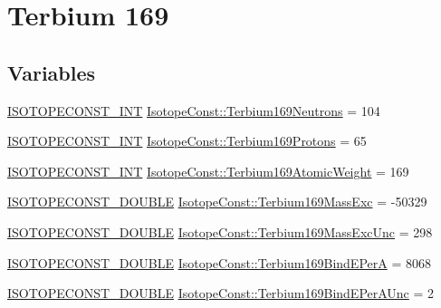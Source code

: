 \hypertarget{group___isotope_const-_terbium-_tb169}{}\section{Terbium 169}
\label{group___isotope_const-_terbium-_tb169}
\subsection*{Variables}
\begin{DoxyCompactItemize}
\item 
\mbox{\hyperlink{group___isotope_const-_macros_ga5f18360b3e99483a35c32d789e62621c}{I\+S\+O\+T\+O\+P\+E\+C\+O\+N\+S\+T\+\_\+\+I\+NT}} \mbox{\hyperlink{group___isotope_const-_terbium-_tb169_gab1dd9e00e06811010d57f38a98b6ad04}{Isotope\+Const\+::\+Terbium169\+Neutrons}} = 104
\item 
\mbox{\hyperlink{group___isotope_const-_macros_ga5f18360b3e99483a35c32d789e62621c}{I\+S\+O\+T\+O\+P\+E\+C\+O\+N\+S\+T\+\_\+\+I\+NT}} \mbox{\hyperlink{group___isotope_const-_terbium-_tb169_gac985549900a1838eaeb6dfa70e6d2bb7}{Isotope\+Const\+::\+Terbium169\+Protons}} = 65
\item 
\mbox{\hyperlink{group___isotope_const-_macros_ga5f18360b3e99483a35c32d789e62621c}{I\+S\+O\+T\+O\+P\+E\+C\+O\+N\+S\+T\+\_\+\+I\+NT}} \mbox{\hyperlink{group___isotope_const-_terbium-_tb169_gae640050ebcb10117759b7906a1359c92}{Isotope\+Const\+::\+Terbium169\+Atomic\+Weight}} = 169
\item 
\mbox{\hyperlink{group___isotope_const-_macros_ga8f45a7272ce02c0b4c65c44636ed719a}{I\+S\+O\+T\+O\+P\+E\+C\+O\+N\+S\+T\+\_\+\+D\+O\+U\+B\+LE}} \mbox{\hyperlink{group___isotope_const-_terbium-_tb169_ga88b51cea641234bc7d8f7fda65557bd5}{Isotope\+Const\+::\+Terbium169\+Mass\+Exc}} = -\/50329
\item 
\mbox{\hyperlink{group___isotope_const-_macros_ga8f45a7272ce02c0b4c65c44636ed719a}{I\+S\+O\+T\+O\+P\+E\+C\+O\+N\+S\+T\+\_\+\+D\+O\+U\+B\+LE}} \mbox{\hyperlink{group___isotope_const-_terbium-_tb169_gabbefdcd96aeb06074d9fca487e70594a}{Isotope\+Const\+::\+Terbium169\+Mass\+Exc\+Unc}} = 298
\item 
\mbox{\hyperlink{group___isotope_const-_macros_ga8f45a7272ce02c0b4c65c44636ed719a}{I\+S\+O\+T\+O\+P\+E\+C\+O\+N\+S\+T\+\_\+\+D\+O\+U\+B\+LE}} \mbox{\hyperlink{group___isotope_const-_terbium-_tb169_ga2036083012ead2f50e9e63f0468a5683}{Isotope\+Const\+::\+Terbium169\+Bind\+E\+PerA}} = 8068
\item 
\mbox{\hyperlink{group___isotope_const-_macros_ga8f45a7272ce02c0b4c65c44636ed719a}{I\+S\+O\+T\+O\+P\+E\+C\+O\+N\+S\+T\+\_\+\+D\+O\+U\+B\+LE}} \mbox{\hyperlink{group___isotope_const-_terbium-_tb169_gad992d56a77eb4b87927a2cb2d88f2823}{Isotope\+Const\+::\+Terbium169\+Bind\+E\+Per\+A\+Unc}} = 2

\end{DoxyCompactItemize}
